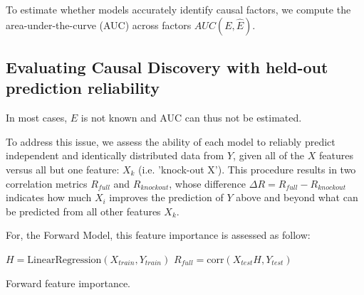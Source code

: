 To estimate whether models accurately identify causal factors, we compute the area-under-the-curve (AUC) across factors $AUC(E, \hat E)$.

\subsection{Evaluating Causal Discovery with held-out prediction reliability}

In most cases, $E$ is not known and AUC can thus not be estimated.

To address this issue, we assess the ability of each model to reliably predict independent and identically distributed data from $Y$, given all of the $X$ features versus all but one feature: $X_k$ (i.e. 'knock-out X'). This procedure results in two correlation metrics $R_{full}$ and $R_{knockout}$, whose difference $\Delta R=R_{full}-R_{knockout}$ indicates how much $X_i$ improves the prediction of $Y$ above and beyond what can be predicted from all other features $X_k$.

For, the Forward Model, this feature importance is assessed as follow:

\begin{algorithm}[H]
    $H = \text{LinearRegression}(X_{train}, Y_{train})$\;
    $R_{full} = \text{corr}(X_{test} H, Y_{test})$\;

    \caption{Forward feature importance.}
    \label{algorithm:fwd_fi}
\end{algorithm}

